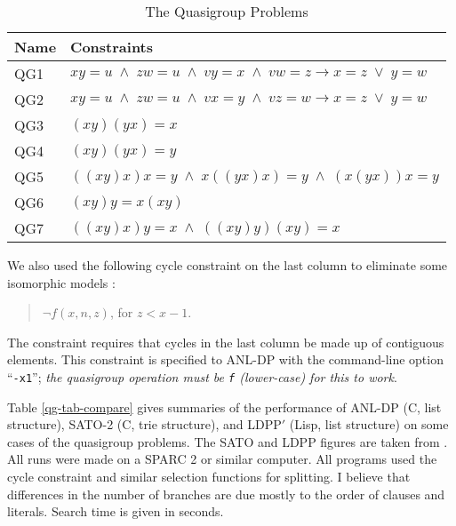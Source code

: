 \begin{table}[htb] \centering
\caption{The Quasigroup Problems}  \label{qg-tab}
\begin{tabular}{ll} 
Name & Constraints \\
\hline
QG1 & $xy=u \;\wedge\; zw=u \;\wedge\; vy=x \;\wedge\; vw= z \rightarrow x=z \;\vee\; y=w$ \\
QG2 & $xy=u \;\wedge\; zw=u \;\wedge\; vx=y \;\wedge\; vz= w \rightarrow x=z \;\vee\; y=w$ \\
QG3 & $(xy)(yx)=x$ \\
QG4 & $(xy)(yx)=y$ \\
QG5 & $((xy)x)x=y \;\wedge\; x((yx)x)=y \;\wedge\; (x(yx))x=y$ \\
QG6 & $(xy)y = x(xy)$ \\
QG7 & $((xy)x)y=x \;\wedge\; ((xy)y)(xy)=x$ \\
\hline
\end{tabular}
\end{table}

We also used the following cycle constraint on the last column to
eliminate some isomorphic models \cite{qg-slaney-fujita-stickel}:
\begin{verse}
$\neg f(x,n,z)$, for $z < x-1$.
\end{verse}
The constraint requires that cycles in the last column be made up
of contiguous elements.  This constraint is specified to ANL-DP with
the command-line option ``\verb:-x1:'';  {\em the quasigroup operation
must be \verb:f: (lower-case) for this to work}.

Table \ref{qg-tab-compare} gives summaries of the performance of
ANL-DP (C, list structure), SATO-2 (C, trie structure), and LDPP$'$
(Lisp, list structure) on some cases of the quasigroup problems.  
The SATO and LDPP figures are taken from \cite{dp-trie}.
All runs were made on a SPARC 2 or similar computer.  All programs used
the cycle constraint and similar selection functions for splitting.  I
believe that differences in the number of branches are due mostly to
the order of clauses and literals.  Search time is given in seconds.

